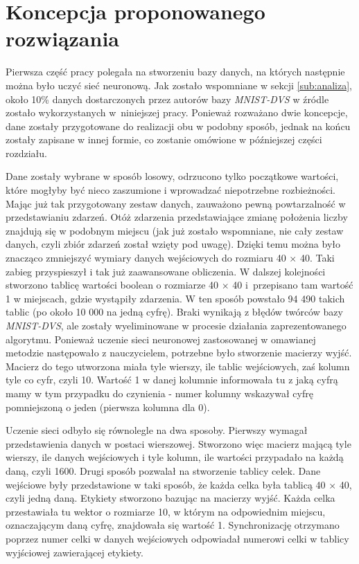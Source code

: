 \section{Koncepcja proponowanego rozwiązania}
\label{sub:koncepcja}

Pierwsza część pracy polegała na stworzeniu bazy danych, na których następnie można było uczyć sieć neuronową. Jak zostało wspomniane w sekcji \ref{sub:analiza}, około 10\% danych dostarczonych przez autorów bazy \textit{MNIST-DVS} w źródle \cite{MNIST_DVS} zostało wykorzystanych w~niniejszej pracy. Ponieważ rozważano dwie koncepcje, dane zostały przygotowane do realizacji obu w podobny sposób, jednak na końcu zostały zapisane w innej formie, co zostanie omówione w późniejszej części rozdziału.

Dane zostały wybrane w sposób losowy, odrzucono tylko początkowe wartości, które mogłyby być nieco zaszumione i wprowadzać niepotrzebne rozbieżności. Mając już tak przygotowany zestaw danych, zauważono pewną powtarzalność w przedstawianiu zdarzeń. Otóż zdarzenia przedstawiające zmianę położenia liczby znajdują się w podobnym miejscu (jak już zostało wspomniane, nie cały zestaw danych, czyli zbiór zdarzeń został wzięty pod uwagę). Dzięki temu można było znacząco zmniejszyć wymiary danych wejściowych do rozmiaru 40 $\times$ 40. Taki zabieg przyspieszył i tak już zaawansowane obliczenia.
W dalszej kolejności stworzono tablicę wartości boolean o rozmiarze 40 $\times$ 40 i~przepisano tam wartość 1 w miejscach, gdzie wystąpiły zdarzenia. W ten sposób powstało 94 490 takich tablic (po około 10 000 na jedną cyfrę). Braki wynikają z błędów twórców bazy \textit{MNIST-DVS}, ale zostały wyeliminowane w procesie działania zaprezentowanego algorytmu. Ponieważ uczenie sieci neuronowej zastosowanej w omawianej metodzie następowało z nauczycielem, potrzebne było stworzenie macierzy wyjść. Macierz do tego utworzona miała tyle wierszy, ile tablic wejściowych, zaś kolumn tyle co cyfr, czyli 10. Wartość 1 w danej kolumnie informowała tu z jaką cyfrą mamy w tym przypadku do czynienia - numer kolumny wskazywał cyfrę pomniejszoną o jeden (pierwsza kolumna dla 0).  

Uczenie sieci odbyło się równolegle na dwa sposoby. Pierwszy wymagał przedstawienia danych w postaci wierszowej. Stworzono więc macierz mającą tyle wierszy, ile danych wejściowych i tyle kolumn, ile wartości przypadało na każdą daną, czyli 1600. Drugi sposób pozwalał na stworzenie tablicy celek. Dane wejściowe były przedstawione w taki sposób, że każda celka była tablicą 40 $\times$ 40, czyli jedną daną. Etykiety stworzono bazując na macierzy wyjść. Każda celka przestawiała tu wektor o rozmiarze 10, w którym na odpowiednim miejscu, oznaczającym daną cyfrę, znajdowała się wartość 1. Synchronizację otrzymano poprzez numer celki w danych wejściowych odpowiadał numerowi celki w tablicy wyjściowej zawierającej etykiety.

